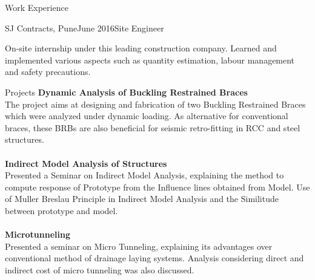 \documentclass{resume} %
\begin{document}
\begin{rSection}{Work Experience}

    \begin{rSubsection}{SJ Contracts, Pune}{June 2016}{Site Engineer}{}
    \item On-site internship under this leading construction company. Learned and implemented various aspects such as quantity estimation, labour management and safety precautions.
    \end{rSubsection}
    
    
\end{rSection}
\begin{rSection}{Projects}
{\bf Dynamic Analysis of Buckling Restrained Braces}
\\The project aims at designing and fabrication of two Buckling Restrained Braces which were analyzed under dynamic loading. As alternative for conventional braces, these BRBs are also beneficial for seismic retro-fitting in RCC and steel structures.\\
\\{\bf Indirect Model Analysis of Structures}\\
Presented a Seminar on Indirect Model Analysis, explaining the method to compute response of Prototype from the Influence lines obtained from Model. Use of Muller Breslau Principle in Indirect Model Analysis and the Similitude between prototype and  model.\\
\\{\bf Microtunneling}\\
Presented a seminar on Micro Tunneling, explaining its advantages over conventional method of drainage laying systems. Analysis considering direct and indirect cost of micro tunneling was also discussed.

\end{rSection}
\end{document}
